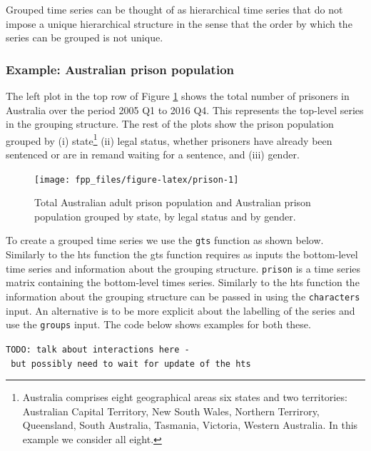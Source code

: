 \documentclass[]{book}
\let\rmarkdownfootnote\footnote%
\def\footnote{\protect\rmarkdownfootnote}
\begin{document}
Grouped time series can be thought of as hierarchical time series that do not impose a unique hierarchical structure in the sense that the order by which the series can be grouped is not unique.

\hypertarget{example-australian-prison-population}{%
\subsubsection*{Example: Australian prison population}\label{example-australian-prison-population}}

The left plot in the top row of Figure \ref{fig:prison} shows the total number of prisoners in Australia over the period 2005 Q1 to 2016 Q4. This represents the top-level series in the grouping structure. The rest of the plots show the prison population grouped by (i) state\footnote{Australia comprises eight geographical areas six states and two territories: Australian Capital Territory, New South Wales, Northern Terrirory, Queensland, South Australia, Tasmania, Victoria, Western Australia. In this example we consider all eight.} (ii) legal status, whether prisoners have already been sentenced or are in remand waiting for a sentence, and (iii) gender.

\begin{figure}

{\centering \texttt{[image: fpp\_files/figure-latex/prison-1]} 

}

\caption{Total Australian adult prison population and Australian prison population grouped by state, by legal status and by gender.}\label{fig:prison}
\end{figure}

To create a grouped time series we use the \texttt{gts} function as shown below. Similarly to the hts function the gts function requires as inputs the bottom-level time series and information about the grouping structure. \texttt{prison} is a time series matrix containing the bottom-level times series. Similarly to the hts function the information about the grouping structure can be passed in using the \texttt{characters} input. An alternative is to be more explicit about the labelling of the series and use the \texttt{groups} input. The code below shows examples for both these.

\texttt{TODO:\ talk\ about\ interactions\ here\ -\ but\ possibly\ need\ to\ wait\ for\ update\ of\ the\ hts}
\end{document}
